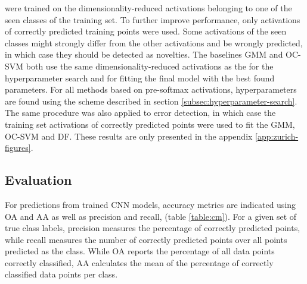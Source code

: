 \documentclass[10pt]{article}
\begin{document}
 were trained on the dimensionality-reduced activations belonging to one of the seen classes of the training set. To further improve performance, only activations of correctly predicted training points were used. Some activations of the seen classes might strongly differ from the other activations and be wrongly predicted, in which case they should be detected as novelties. The baselines \gls{GMM} and \gls{OC-SVM} both use the same dimensionality-reduced activations as the  for the hyperparameter search and for fitting the final model with the best found parameters. For all methods based on pre-softmax activations, hyperparameters are found using the scheme described in section \ref{subsec:hyperparameter-search}. The same procedure was also applied to error detection, in which case the training set activations of correctly predicted points were used to fit the \gls{GMM}, \gls{OC-SVM} and \acrlong{DF}. These results are only presented in the appendix \ref{app:zurich-figures}.

\subsection{Evaluation}
For predictions from trained \gls{CNN} models, accuracy metrics are indicated using \gls{OA} and \gls{AA} as well as precision and recall,  (table \ref{table:cm}). For a given set of true class labels, precision measures the percentage of correctly predicted points, while recall measures the number of correctly predicted points over all points predicted as the class.  While \gls{OA} reports the percentage of all data points correctly classified, \gls{AA} calculates the mean of the percentage of correctly classified data points per class. 
\end{document}
